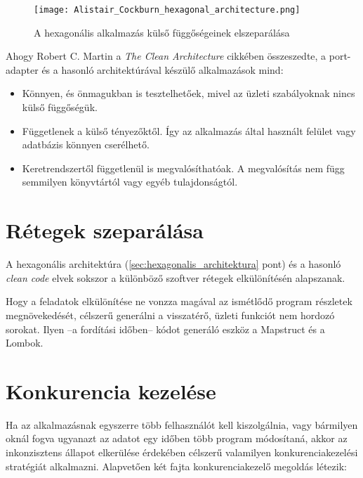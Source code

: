 \begin{figure}[hbt] 
	\centering
	\texttt{[image: Alistair\_Cockburn\_hexagonal\_architecture.png]}
	\caption[Hexagonális alkalmazások felépítése]{
		A hexagonális alkalmazás külső függőségeinek elszeparálása}
	\label{fig:Alistair_Cockburn_hexagonal_architecture}
\end{figure}



Ahogy \foreignlanguage{british}{Robert C. Martin} a \foreignlanguage{british}{\textit{The Clean Architecture}} cikkében \cite{The_Clean_Architecture} összeszedte, a port-adapter és a hasonló architektúrával készülő alkalmazások mind:	
\begin{itemize}
	\item Könnyen, és önmagukban is tesztelhetőek, mivel az üzleti szabályoknak nincs külső függőségük.
	
	\item Függetlenek a külső tényezőktől. Így az alkalmazás által használt felület vagy adatbázis könnyen cserélhető.
	
	\item Keretrendszertől függetlenül is megvalósíthatóak. A megvalósítás nem függ semmilyen könyvtártól vagy egyéb tulajdonságtól.
\end{itemize}
	


\section{Rétegek szeparálása}\label{sec:retegek_szeparalasa}
A hexagonális architektúra (\ref{sec:hexagonalis_architektura} pont) és a hasonló \textit{clean code} \cite{clean_code_chapter_systems} elvek sokszor a különböző szoftver rétegek elkülönítésén alapszanak.


Hogy a feladatok elkülönítése ne vonzza magával az ismétlődő program részletek megnövekedését, célszerű generálni a visszatérő, üzleti funkciót nem hordozó sorokat. Ilyen --a fordítási időben-- kódot generáló eszköz a Mapstruct és a Lombok.


\section{Konkurencia kezelése}\label{sec:konkurencia_kezekese}
Ha az alkalmazásnak egyszerre több felhasználót kell kiszolgálnia, vagy bármilyen oknál fogva ugyanazt az adatot egy időben több program módosítaná, akkor az inkonzisztens állapot elkerülése érdekében célszerű valamilyen konkurenciakezelési stratégiát alkalmazni. Alapvetően két fajta konkurenciakezelő megoldás létezik:

